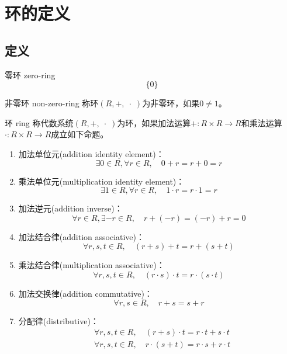 \section{环的定义}

\subsection{定义}

\begin{definition}{零环 zero-ring}
	$$
	\{0\}
	$$
\end{definition}

\begin{definition}{非零环 non-zero-ring}
	称环$(R,+,\;\cdot\;)$为非零环，如果$0\ne 1$。
\end{definition}

\begin{definition}{环 ring}
	称代数系统$(R,+,\;\cdot\;)$为环，如果加法运算$+:R\times R\to R$和乘法运算$\cdot :R\times R\to R$成立如下命题。
	\begin{enumerate}
		\item 加法单位元(addition identity element)：
		$$
		\exists 0\in R,\forall r\in R,\quad 0+r=r+0=r
		$$
		\item 乘法单位元(multiplication identity element)：
		$$
		\exists 1\in R,\forall r\in R,\quad 1\cdot r=r\cdot 1=r
		$$
		\item 加法逆元(addition inverse)：
		$$
		\forall r\in R,\exists-r\in R,\quad r+(-r)=(-r)+r=0
		$$
		\item 加法结合律(addition associative)：
		$$
		\forall r,s,t\in R,\quad (r+s)+t=r+(s+t)
		$$
		\item 乘法结合律(multiplication associative)：
		$$
		\forall r,s,t\in R,\quad (r\cdot s)\cdot t=r\cdot (s\cdot t)
		$$
		\item 加法交换律(addition commutative)：
		$$
		\forall r,s\in R,\quad r+s=s+r
		$$
		\item 分配律(distributive)：
		\begin{align*}
			&\forall r,s,t\in R,\quad (r+s)\cdot t=r\cdot t+s\cdot t\\
			&\forall r,s,t\in R,\quad r\cdot(s+t)=r\cdot s+r\cdot t
		\end{align*}
	\end{enumerate}
\end{definition}

